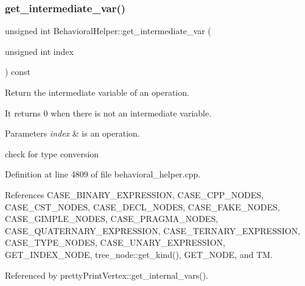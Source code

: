 \subsubsection{\texorpdfstring{get\+\_\+intermediate\+\_\+var()}{get\_intermediate\_var()}}
{\footnotesize\ttfamily unsigned int Behavioral\+Helper\+::get\+\_\+intermediate\+\_\+var (\begin{DoxyParamCaption}\item[{unsigned int}]{index }\end{DoxyParamCaption}) const\hspace{0.3cm}{\ttfamily [virtual]}}



Return the intermediate variable of an operation. 

It returns 0 when there is not an intermediate variable. 
\begin{DoxyParams}{Parameters}
{\em index} & is an operation. \\
\hline
\end{DoxyParams}
check for type conversion 

Definition at line 4809 of file behavioral\+\_\+helper.\+cpp.



References C\+A\+S\+E\+\_\+\+B\+I\+N\+A\+R\+Y\+\_\+\+E\+X\+P\+R\+E\+S\+S\+I\+ON, C\+A\+S\+E\+\_\+\+C\+P\+P\+\_\+\+N\+O\+D\+ES, C\+A\+S\+E\+\_\+\+C\+S\+T\+\_\+\+N\+O\+D\+ES, C\+A\+S\+E\+\_\+\+D\+E\+C\+L\+\_\+\+N\+O\+D\+ES, C\+A\+S\+E\+\_\+\+F\+A\+K\+E\+\_\+\+N\+O\+D\+ES, C\+A\+S\+E\+\_\+\+G\+I\+M\+P\+L\+E\+\_\+\+N\+O\+D\+ES, C\+A\+S\+E\+\_\+\+P\+R\+A\+G\+M\+A\+\_\+\+N\+O\+D\+ES, C\+A\+S\+E\+\_\+\+Q\+U\+A\+T\+E\+R\+N\+A\+R\+Y\+\_\+\+E\+X\+P\+R\+E\+S\+S\+I\+ON, C\+A\+S\+E\+\_\+\+T\+E\+R\+N\+A\+R\+Y\+\_\+\+E\+X\+P\+R\+E\+S\+S\+I\+ON, C\+A\+S\+E\+\_\+\+T\+Y\+P\+E\+\_\+\+N\+O\+D\+ES, C\+A\+S\+E\+\_\+\+U\+N\+A\+R\+Y\+\_\+\+E\+X\+P\+R\+E\+S\+S\+I\+ON, G\+E\+T\+\_\+\+I\+N\+D\+E\+X\+\_\+\+N\+O\+DE, tree\+\_\+node\+::get\+\_\+kind(), G\+E\+T\+\_\+\+N\+O\+DE, and TM.



Referenced by pretty\+Print\+Vertex\+::get\+\_\+internal\+\_\+vars().

